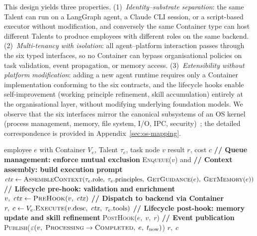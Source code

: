 \documentclass[11pt,a4paper]{article}
\begin{document}
This design yields three properties.  (1)~\emph{Identity--substrate separation}: the same Talent can run on a LangGraph agent, a Claude CLI session, or a script-based executor without modification, and conversely the same Container type can host different Talents to produce employees with different roles on the same backend.  (2)~\emph{Multi-tenancy with isolation}: all agent--platform interaction passes through the six typed interfaces, so no Container can bypass organisational policies on task validation, event propagation, or memory access.  (3)~\emph{Extensibility without platform modification}: adding a new agent runtime requires only a Container implementation conforming to the six contracts, and the lifecycle hooks enable self-improvement (working principle refinement, skill accumulation) entirely at the organisational layer, without modifying underlying foundation models.  We observe that the six interfaces mirror the canonical subsystems of an OS kernel (process management, memory, file system, I/O, IPC, security)~\cite{tanenbaum2014modern, silberschatz2018os}; the detailed correspondence is provided in Appendix~\ref{sec:os-mapping}.


\begin{algorithm}[t]
\caption{Talent Assembly.}
\label{alg:harness}
\begin{algorithmic}[1]
\Require employee $e$ with Container $V_e$, Talent $\tau_e$, task node $v$
\Ensure result $r$, cost $c$
\State \textbf{// Queue management: enforce mutual exclusion}
    \State \textsc{Enqueue}($v$) and \Return
\EndIf
\State \textbf{// Context assembly: build execution prompt}
\State $\mathit{ctx} \gets \textsc{AssembleContext}(\tau_e.\mathrm{role},\; \tau_e.\mathrm{principles},\; \textsc{GetGuidance}(e),\; \textsc{GetMemory}(e))$
\State \textbf{// Lifecycle pre-hook: validation and enrichment}
\State $v,\; \mathit{ctx} \gets \textsc{PreHook}(v,\; \mathit{ctx})$ 
\State \textbf{// Dispatch to backend via Container}
\State $r,\; c \gets V_e.\textsc{Execute}(v.\mathrm{desc},\; \mathit{ctx},\; \tau_e.\mathrm{tools})$
\State \textbf{// Lifecycle post-hook: memory update and skill refinement}
\State \textsc{PostHook}($e,\; v,\; r$) 
\State \textbf{// Event publication}
\State \textsc{Publish}($\varepsilon(v,\; \textsc{Processing} \to \textsc{Completed},\; e,\; t_{\mathrm{now}})$)
\State \Return $r,\; c$
\end{algorithmic}
\end{algorithm}
\end{document}

